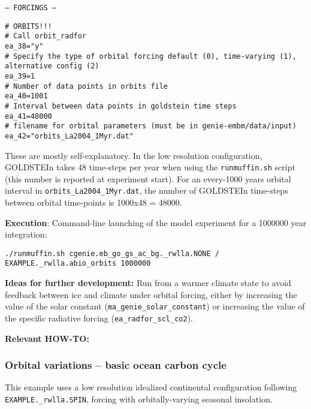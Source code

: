 \documentclass[10pt,twoside]{article}
\begin{document}
\begin{compactitem}
                \item \texttt{--- FORCINGS ---}
                \vspace{-5pt}\begin{verbatim}
# ORBITS!!!
# Call orbit_radfor
ea_38="y"
# Specify the type of orbital forcing default (0), time-varying (1),
alternative config (2)
ea_39=1
# Number of data points in orbits file
ea_40=1001
# Interval between data points in goldstein time steps
ea_41=48000
# filename for orbital parameters (must be in genie-embm/data/input)
ea_42="orbits_La2004_1Myr.dat"
                \end{verbatim}\vspace{-5pt}
These are mostly self-explanatory. In the low resolution configuration, GOLDSTEIn takes 48 time-steps per year when using the \texttt{runmuffin.sh} script (this number is reported at experiment start). For an every-1000 years orbital interval in \texttt{orbits\_La2004\_1Myr.dat}, the number of GOLDSTEIn time-steps between orbital time-points is 1000x48 = 48000.

        \end{compactitem}

\noindent \textbf{Execution}: Command-line launching of the model experiment for a 1000000 year integration:
\vspace{-10pt}\begin{verbatim}./runmuffin.sh cgenie.eb_go_gs_ac_bg._rwlla.NONE /
EXAMPLE._rwlla.abio_orbits 1000000\end{verbatim}\vspace{-10pt}

\noindent \textbf{Ideas for further development:} 
Run from a warmer climate state to avoid feedback between ice and climate under orbital forcing, either by increasing the value of the solar constant (\texttt{ma\_genie\_solar\_constant}) or increasing the value of the specific radiative forcing (\texttt{ea\_radfor\_scl\_co2}).

\noindent \textbf{Relevant HOW-TO:} 


\subsubsection{Orbital variations -- basic ocean carbon cycle}\label{EXAMPLE.rwlla.bioorbits}

This example uses a low resolution idealized continental configuration following \texttt{EXAMPLE.\_rwlla.SPIN}, forcing with orbitally-varying seasonal insolation.
\end{document}

